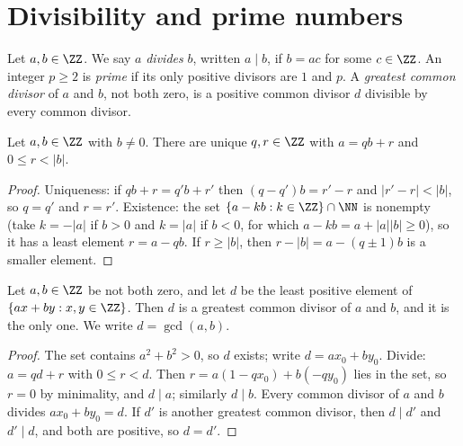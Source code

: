 \section{Divisibility and prime numbers}\label{number-systems:section-divisibility}

\begin{definition}\label{number-systems:definition-divisibility}
Let $a, b \in \ZZ$. We say $a$ \emph{divides} $b$, written $a \mid b$, if $b = ac$
for some $c \in \ZZ$. An integer $p \geq 2$ is \emph{prime} if its only positive
divisors are $1$ and $p$. A \emph{greatest common divisor} of $a$ and $b$, not
both zero, is a positive common divisor $d$ divisible by every common divisor.
\end{definition}

\begin{theorem}\label{number-systems:theorem-division}
Let $a, b \in \ZZ$ with $b \neq 0$. There are unique $q, r \in \ZZ$ with
$a = qb + r$ and $0 \leq r < |b|$.
\end{theorem}

\begin{proof}
Uniqueness: if $qb + r = q'b + r'$ then $(q - q')b = r' - r$ and
$|r' - r| < |b|$, so $q = q'$ and $r = r'$. Existence: the set
$\{a - kb : k \in \ZZ\} \cap \NN$ is nonempty (take $k = -|a|$ if $b > 0$ and
$k = |a|$ if $b < 0$, for which $a - kb = a + |a||b| \geq 0$), so it has a least
element $r = a - qb$. If
$r \geq |b|$, then $r - |b| = a - (q \pm 1)b$ is a smaller element.
\end{proof}

\begin{theorem}[B\'ezout]\label{number-systems:theorem-bezout}
Let $a, b \in \ZZ$ be not both zero, and let $d$ be the least positive element of
$\{ax + by : x, y \in \ZZ\}$. Then $d$ is a greatest common divisor of $a$ and
$b$, and it is the only one. We write $d = \gcd(a, b)$.
\end{theorem}

\begin{proof}
The set contains $a^2 + b^2 > 0$, so $d$ exists; write $d = ax_0 + by_0$. Divide:
$a = qd + r$ with $0 \leq r < d$. Then $r = a(1 - qx_0) + b(-qy_0)$ lies in the set,
so $r = 0$ by minimality, and $d \mid a$; similarly $d \mid b$. Every common
divisor of $a$ and $b$ divides $ax_0 + by_0 = d$. If $d'$ is another greatest
common divisor, then $d \mid d'$ and $d' \mid d$, and both are positive, so
$d = d'$.
\end{proof}


